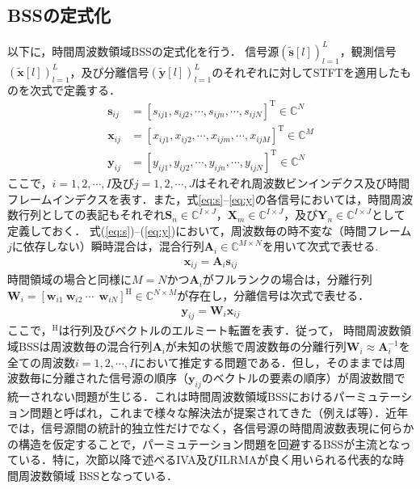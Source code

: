 \documentclass[10.5pt]{jarticle}
\begin{document}
\subsection{BSSの定式化}

\hspace{1.0em}以下に，時間周波数領域BSSの定式化を行う．
信号源$( \tilde{\bm{s}}[l] )_{l=1}^L$，観測信号$( \tilde{\bm{x}}[l] )_{l=1}^L$，及び分離信号$( \tilde{\bm{y}}[l] )_{l=1}^L$のそれぞれに対して{STFTを適用したものを次式で定義する．}
\begin{align}
\bm{s}_{ij} &= [s_{ij1}, s_{ij2}, \cdots, s_{ijn}, \cdots, s_{ijN}]^{\mathrm{T}} \in \mathbb{C}^{N} \label{eq:s} \\
\bm{x}_{ij} &= [x_{ij1}, x_{ij2}, \cdots, x_{ijm}, \cdots, x_{ijM}]^{\mathrm{T}} \in \mathbb{C}^{M} \label{eq:x} \\
\bm{y}_{ij} &= [y_{ij1}, y_{ij2}, \cdots, y_{ijn}, \cdots, y_{ijN}]^{\mathrm{T}} \in \mathbb{C}^{N} \label{eq:y}
\end{align}
ここで，$i=1, 2,  \cdots, I$及び$j=1, 2,  \cdots, J$はそれぞれ周波数ビンインデクス及び時間フレームインデクスを表す．また，式\eqref{eq:s}--\eqref{eq:y}の各信号においては，時間周波数行列としての表記もそれぞれ$\bm{S}_n\in\mathbb{C}^{{I\times J}}$，$\bm{X}_m\in\mathbb{C}^{{I\times J}}$，及び$\bm{Y}_n\in\mathbb{C}^{{I\times J}}$として定義しておく．
{式(\ref{eq:s})--(\ref{eq:y})において}，周波数毎の時不変な（時間フレーム$j$に依存しない）瞬時混合は，混合行列$\bm{A}_i \in \mathbb{C}^{M\times N}$を用いて次式で表せる.
\begin{align}
  \bm{x}_{ij} = \bm{A}_i \bm{s}_{ij} \label{eq:xas}
\end{align}
時間領域の場合と同様に$M=N$かつ$\bm{A}_i$がフルランクの場合は，分離行列$\bm{W}_{i} = [\bm{w}_{i1}~\bm{w}_{i2}~\cdots~ ~\bm{w}_{iN}]^{\mathrm{H}} \in \mathbb{C}^{N \times M} $が存在し，分離信号は次式で表せる．
\begin{align}
  \bm{y}_{ij} = \bm{W}_i \bm{x}_{ij} \label{eq:ywj}
\end{align}
ここで，$^{\mathrm{H}}$は行列及びベクトルのエルミート転置を表す．従って，
{時間周波数領域BSSは周波数毎の混合行列$\bm{A}_i$が未知の状態で周波数毎の分離行列$\bm{W}_{i} \approx \bm{A}_i^{-1}$}を全ての周波数$i=1, 2, \cdots, I$において推定する問題である．但し，そのままでは周波数毎に分離された信号源の順序（$\bm{y}_{ij}$のベクトルの要素の順序）が周波数間で統一されない問題が生じる．これは時間周波数領域BSSにおけるパーミュテーション問題\cite{permute}と呼ばれ，これまで様々な解決法が提案されてきた（例えば\cite{persolve1,persolve2,persolve3,persolve4}等）．近年では，信号源間の統計的独立性だけでなく，各信号源の時間周波数表現に何らかの構造を仮定することで，パーミュテーション問題を回避するBSSが主流となっている．特に，次節以降で述べるIVA及びILRMAが良く用いられる代表的な時間周波数領域
BSSとなっている．
\end{document}
